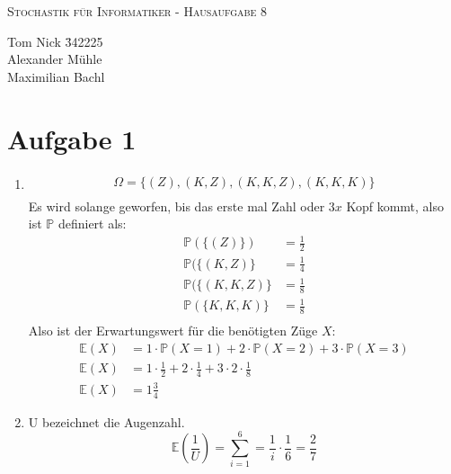 \documentclass[10pt,a4paper,parskip=half]{scrartcl}
\newcommand{\PP}{\mathbb{P}}
\newcommand{\E}{\mathbb{E}}
\begin{document}
\begin{center}
\textsc{\Large{Stochastik für Informatiker - Hausaufgabe 8}} \\
\end{center}
\begin{tabbing}
Tom Nick \hspace{1.4cm}\= 342225\\
Alexander Mühle\\
Maximilian Bachl
\end{tabbing}
\section*{Aufgabe 1}
\begin{enumerate}
\item \begin{align*}
\Omega = \{(Z), (K, Z), (K, K, Z) , (K, K, K)\} \\
\end{align*}
Es wird solange geworfen, bis das erste mal Zahl oder $3x$ Kopf kommt, also ist $\PP$ definiert als:
\begin{align*}
\PP(\{(Z)\}) &= \frac{1}{2} \\
\PP(\{(K, Z)\} &= \frac{1}{4} \\
\PP(\{(K, K, Z)\} &= \frac{1}{8} \\
\PP(\{K,K,K)\} &= \frac{1}{8} \\
\end{align*}
Also ist der Erwartungswert für die benötigten Züge $X$:
\begin{align*}
\E(X) &= 1 \cdot \PP(X = 1) + 2\cdot\PP(X=2)+3\cdot\PP(X=3) \\
\E(X) &= 1 \cdot \frac{1}{2} + 2\cdot \frac{1}{4} + 3 \cdot 2 \cdot \frac{1}{8} \\
\E(X) &= 1 \frac{3}{4}
\end{align*}
\item U bezeichnet die Augenzahl.
$$\E(\frac{1}{U}) = \sum_{i=1}^{6} = \frac{1}{i} \cdot \frac{1}{6} = \frac{2}{7} $$
\end{enumerate}
\end{document}
